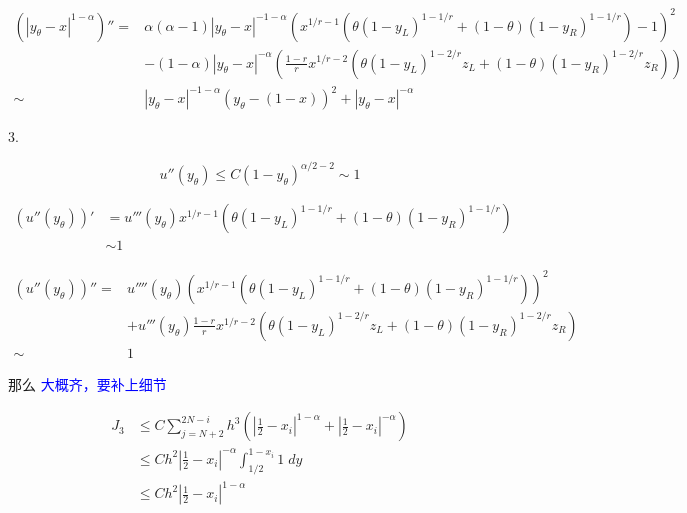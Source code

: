 \documentclass{ctexart}
\theoremstyle{definition}
\theoremstyle{remark}
\numberwithin{equation}{section}
\begin{document}
\begin{equation}
    \begin{aligned}
        (|y_\theta-x|^{1-\alpha})''
        =    & \alpha(\alpha-1)|y_\theta-x|^{-1-\alpha} (x^{1/r-1}(\theta (1-y_L)^{1-1/r} + (1-\theta)(1-y_R)^{1-1/r}) - 1)^2            \\
             & - (1-\alpha)|y_\theta-x|^{-\alpha}(\frac{1-r}{r} x^{1/r-2} (\theta (1-y_L)^{1-2/r} z_L + (1-\theta) (1-y_R)^{1-2/r} z_R)) \\
        \sim & |y_\theta-x|^{-1-\alpha} (y_\theta - (1-x))^2 + |y_\theta-x|^{-\alpha}
    \end{aligned}
\end{equation}


3.

\begin{equation}
    u''(y_\theta) \le C (1-y_\theta)^{\alpha/2-2} \sim 1
\end{equation}


\begin{equation}
    \begin{aligned}
        (u''(y_\theta))' & = u'''(y_\theta) x^{1/r-1}(\theta (1-y_L)^{1-1/r} + (1-\theta) (1-y_R)^{1-1/r}) \\
                         & \sim 1
    \end{aligned}
\end{equation}

\begin{equation}
    \begin{aligned}
        (u''(y_\theta))'' =
             & u''''(y_\theta) (x^{1/r-1}(\theta (1-y_L)^{1-1/r} + (1-\theta) (1-y_R)^{1-1/r}))^2                 \\
             & + u'''(y_\theta)\frac{1-r}{r} x^{1/r-2}(\theta (1-y_L)^{1-2/r}z_L + (1-\theta) (1-y_R)^{1-2/r}z_R) \\
        \sim & 1
    \end{aligned}
\end{equation}

那么 \textcolor{blue}{大概齐，要补上细节}

\begin{equation}
    \begin{aligned}
        J_3 & \le C \sum_{j=N+2}^{2N-i} h^3 ( |\frac{1}{2}-x_i|^{1-\alpha} +  |\frac{1}{2}-x_i|^{-\alpha} ) \\
            & \le C h^2 |\frac{1}{2}-x_i|^{-\alpha} \int_{1/2}^{1-x_i} 1 \; dy                              \\
            & \le C h^2 |\frac{1}{2}-x_i|^{1-\alpha}
    \end{aligned}
\end{equation}
\end{document}
